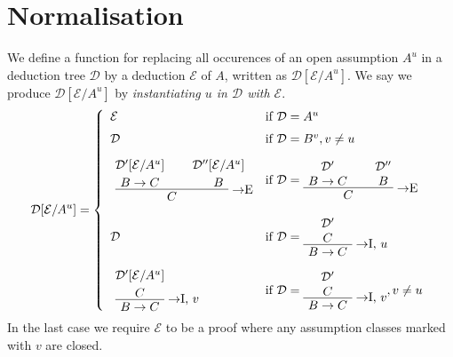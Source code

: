 \section{Normalisation}

\begin{definition}
We define a function for replacing all occurences of an open assumption $A^u$ in
a deduction tree $\mathcal{D}$ by a deduction $\mathcal{E}$ of $A$, written as
$\mathcal{D}[\mathcal{E}/A^u]$. We say we produce $\mathcal{D}[\mathcal{E}/A^u]$
by \textit{instantiating $u$ in $\mathcal{D}$ with $\mathcal{E}$}.
\[
  \mathcal{D}[\mathcal{E}/A^u] =
  \left\{
  \begin{array}{ll}
  \mathcal{E} & \mbox{if } \mathcal{D} = A^u \\[6pt]
  \mathcal{D} & \mbox{if } \mathcal{D} = B^v, v \neq u \\[10pt]
  \AxiomC{$\mathcal{D}'[\mathcal{E}/A^u]$}
  \noLine
  \UnaryInfC{$B \to C$}
  \AxiomC{$\mathcal{D}''[\mathcal{E}/A^u]$}
  \noLine
  \UnaryInfC{$B$}
  \RightLabel{$\to$E}
  \BinaryInfC{$C$}
  \DisplayProof & \mbox{if } \mathcal{D} =
    \AxiomC{$\mathcal{D}'$}
    \noLine
    \UnaryInfC{$B \to C$}
    \AxiomC{$\mathcal{D}''$}
    \noLine
    \UnaryInfC{$B$}
    \RightLabel{$\to$E}
    \BinaryInfC{$C$}
    \DisplayProof \\[24pt]
  \mathcal{D} & \mbox{if } \mathcal{D} =
    \AxiomC{$\mathcal{D}'$}
    \noLine
    \UnaryInfC{$C$}
    \RightLabel{$\to$I, $u$}
    \UnaryInfC{$B \to C$}
    \DisplayProof \\[20pt]
  \AxiomC{$\mathcal{D}'[\mathcal{E}/A^u]$}
  \noLine
  \UnaryInfC{$C$}
  \RightLabel{$\to$I, $v$}
  \UnaryInfC{$B \to C$}
  \DisplayProof & \mbox{if } \mathcal{D} =
    \AxiomC{$\mathcal{D}'$}
    \noLine
    \UnaryInfC{$C$}
    \RightLabel{$\to$I, $v$}
    \UnaryInfC{$B \to C$}
    \DisplayProof, v \neq u
  \end{array}
  \right.
\]
In the last case we require $\mathcal{E}$ to be a proof where any assumption
classes marked with $v$ are closed.
\end{definition}

